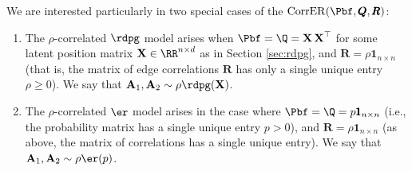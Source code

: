 We are interested particularly in two special cases of the $\mathrm{CorrER}(\Pbf, \pmb Q, \pmb R)$:
\begin{enumerate}
    \item The $\rho$-correlated $\rdpg$ model arises when $\Pbf = \Q=\X\X^\top$ for some latent position matrix $\X \in \RR^{n \times d}$  as in Section \ref{sec:rdpg}, and $\pmb R = \rho \pmb 1_{n \times n}$ (that is, the matrix of edge correlations $\pmb R$ has only a single unique entry $\rho\geq 0$). We say that $\A_1, \A_2 \sim \rho\rdpg(\X)$.
    \item The $\rho$-correlated $\er$ model arises in the case where $\Pbf = \Q = p\pmb 1_{n \times n}$ (i.e.,  the probability matrix has a single unique entry $p>0$), and $\pmb R = \rho\pmb 1_{n \times n}$ (as above, the matrix of correlations has a single unique entry). We say that $\A_1, \A_2 \sim \rho\er(p)$.
\end{enumerate}